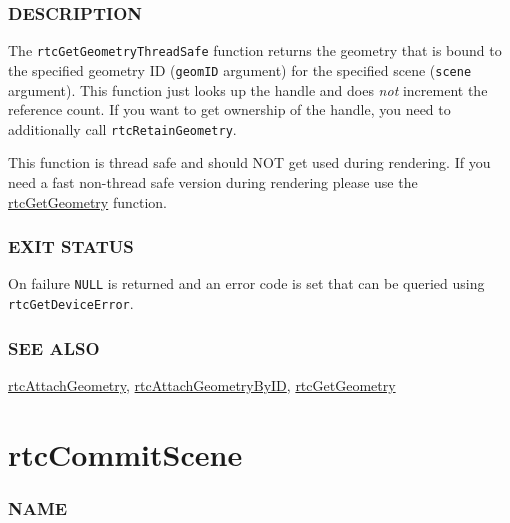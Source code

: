 \subsubsection{DESCRIPTION}\label{description}

The \texttt{rtcGetGeometryThreadSafe} function returns the geometry that
is bound to the specified geometry ID (\texttt{geomID} argument) for the
specified scene (\texttt{scene} argument). This function just looks up
the handle and does \emph{not} increment the reference count. If you
want to get ownership of the handle, you need to additionally call
\texttt{rtcRetainGeometry}.

This function is thread safe and should NOT get used during rendering.
If you need a fast non-thread safe version during rendering please use
the \hyperref[rtcgetgeometry]{rtcGetGeometry} function.

\subsubsection{EXIT STATUS}\label{exit-status}

On failure \texttt{NULL} is returned and an error code is set that can
be queried using \texttt{rtcGetDeviceError}.

\subsubsection{SEE ALSO}\label{see-also}

\hyperref[rtcattachgeometry]{rtcAttachGeometry},
\hyperref[rtcattachgeometrybyid]{rtcAttachGeometryByID},
\hyperref[rtcgetgeometry]{rtcGetGeometry}

\pagebreak

\section{rtcCommitScene}\label{rtccommitscene}

\subsubsection{NAME}\label{name}

\begin{Shaded}
\begin{Highlighting}[]
\OperatorTok{{-}}
\end{Highlighting}
\end{Shaded}


